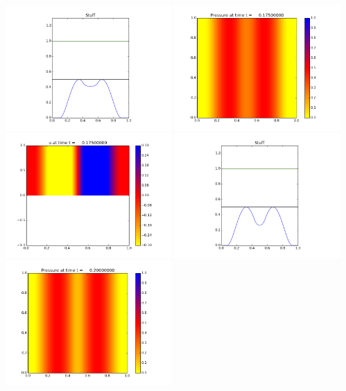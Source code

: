 \documentclass[11pt]{article}
\begin{document}
\vskip 10pt 
\includegraphics[width=0.475\textwidth]{frame0006fig3.png}
\vskip 10pt 
\includegraphics[width=0.475\textwidth]{frame0007fig0.png}
\includegraphics[width=0.475\textwidth]{frame0007fig1.png}
\vskip 10pt 
\includegraphics[width=0.475\textwidth]{frame0007fig3.png}
\vskip 10pt 
\includegraphics[width=0.475\textwidth]{frame0008fig0.png}
\end{document}
